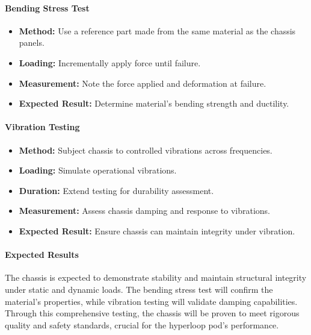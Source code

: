 \paragraph{Bending Stress Test}
\begin{itemize}
    \item \textbf{Method:} Use a reference part made from the same material as the chassis panels.
    \item \textbf{Loading:} Incrementally apply force until failure.
    \item \textbf{Measurement:} Note the force applied and deformation at failure.
    \item \textbf{Expected Result:} Determine material's bending strength and ductility.
\end{itemize}

\paragraph{Vibration Testing}
\begin{itemize}
    \item \textbf{Method:} Subject chassis to controlled vibrations across frequencies.
    \item \textbf{Loading:} Simulate operational vibrations.
    \item \textbf{Duration:} Extend testing for durability assessment.
    \item \textbf{Measurement:} Assess chassis damping and response to vibrations.
    \item \textbf{Expected Result:} Ensure chassis can maintain integrity under vibration.
\end{itemize}

\paragraph{Expected Results}
The chassis is expected to demonstrate stability and maintain structural integrity under static and dynamic loads. The bending stress test will confirm the material's properties, while vibration testing will validate damping capabilities. Through this comprehensive testing, the chassis will be proven to meet rigorous quality and safety standards, crucial for the hyperloop pod's performance.
\newpage
